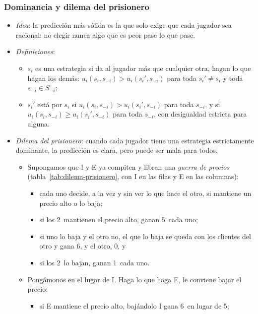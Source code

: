 \documentclass[11pt]{article}
\begin{document}
\subsubsection{Dominancia y dilema del prisionero}\label{sec:dominancia}

\begin{itemize}
\item \emph{Idea}: la predicción más sólida es la que solo exige que cada jugador sea racional: no elegir nunca algo que es peor pase lo que pase.
\item \emph{Definiciones}\nocite{MasColellWhinstonGreen1995}:
  \begin{itemize}
  \item $s_i$ es una estrategia  si da al jugador más que cualquier otra, hagan lo que hagan los demás: $u_i(s_i,s_{-i})>u_i(s_i',s_{-i})$ para toda $s_i'\neq s_i$ y toda $s_{-i}\in S_{-i}$;
  \item $s_i'$ está  por $s_i$ si $u_i(s_i,s_{-i})>u_i(s_i',s_{-i})$ para toda $s_{-i}$, y  si $u_i(s_i,s_{-i})\geq u_i(s_i',s_{-i})$ para toda $s_{-i}$, con desigualdad estricta para alguna.
  \end{itemize}
\item \emph{Dilema del prisionero}: cuando cada jugador tiene una estrategia estrictamente dominante, la predicción es clara, pero puede ser mala para todos.
  \begin{itemize}
  \item Supongamos que \textup{I} y E ya compiten y libran una \emph{guerra de precios} (tabla~\ref{tab:dilema-prisionero}, con \textup{I} en las filas y E en las columnas):
    \begin{itemize}
    \item cada uno decide, a la vez y sin ver lo que hace el otro, si mantiene un precio alto o lo baja;
    \item si los 2~mantienen el precio alto, ganan 5~cada uno;
    \item si uno lo baja y el otro no, el que lo baja se queda con los clientes del otro y gana 6, y el otro, 0, y
    \item si los 2~lo bajan, ganan 1~cada uno.
    \end{itemize}
  \item Pongámonos en el lugar de \textup{I}. Haga lo que haga E, le conviene bajar el precio:
    \begin{itemize}
    \item si E mantiene el precio alto, bajándolo \textup{I} gana 6~en lugar de 5;

\end{itemize}
\end{itemize}
\end{itemize}
\end{document}
